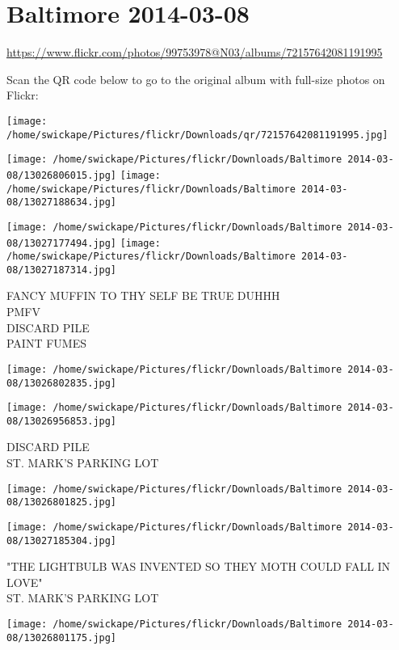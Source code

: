 \documentclass[10pt,letterpaper]{article}
\title{}
\author{}
\date{}
\begin{document}
\section*{Baltimore 2014-03-08}

\url{https://www.flickr.com/photos/99753978@N03/albums/72157642081191995}

Scan the QR code below to go to the original album with full-size photos on Flickr:

\texttt{[image: /home/swickape/Pictures/flickr/Downloads/qr/72157642081191995.jpg]}
\pagebreak

\texttt{[image: /home/swickape/Pictures/flickr/Downloads/Baltimore 2014-03-08/13026806015.jpg]}
\texttt{[image: /home/swickape/Pictures/flickr/Downloads/Baltimore 2014-03-08/13027188634.jpg]}

\texttt{[image: /home/swickape/Pictures/flickr/Downloads/Baltimore 2014-03-08/13027177494.jpg]}
\texttt{[image: /home/swickape/Pictures/flickr/Downloads/Baltimore 2014-03-08/13027187314.jpg]}

FANCY MUFFIN TO THY SELF BE TRUE DUHHH\\
PMFV\\
DISCARD PILE\\
PAINT FUMES
\pagebreak

\texttt{[image: /home/swickape/Pictures/flickr/Downloads/Baltimore 2014-03-08/13026802835.jpg]}

\vspace{0.25in}
\texttt{[image: /home/swickape/Pictures/flickr/Downloads/Baltimore 2014-03-08/13026956853.jpg]}

DISCARD PILE\\
ST. MARK'S PARKING LOT
\pagebreak

\texttt{[image: /home/swickape/Pictures/flickr/Downloads/Baltimore 2014-03-08/13026801825.jpg]}

\vspace{0.25in}
\texttt{[image: /home/swickape/Pictures/flickr/Downloads/Baltimore 2014-03-08/13027185304.jpg]}

"THE LIGHTBULB WAS INVENTED SO THEY MOTH COULD FALL IN LOVE"\\
ST. MARK'S PARKING LOT
\pagebreak

\texttt{[image: /home/swickape/Pictures/flickr/Downloads/Baltimore 2014-03-08/13026801175.jpg]}
\end{document}
